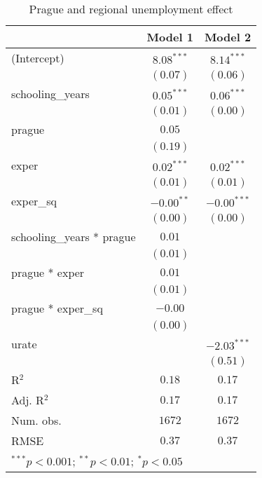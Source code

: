 
\begin{table}
\caption{Prague and regional unemployment effect}
\begin{center}
\begin{tabular}{l c c}
\hline
 & Model 1 & Model 2 \\
\hline
(Intercept)               & $8.08^{***}$ & $8.14^{***}$  \\
                          & $(0.07)$     & $(0.06)$      \\
schooling\_years          & $0.05^{***}$ & $0.06^{***}$  \\
                          & $(0.01)$     & $(0.00)$      \\
prague                    & $0.05$       &               \\
                          & $(0.19)$     &               \\
exper                     & $0.02^{***}$ & $0.02^{***}$  \\
                          & $(0.01)$     & $(0.01)$      \\
exper\_sq                 & $-0.00^{**}$ & $-0.00^{***}$ \\
                          & $(0.00)$     & $(0.00)$      \\
schooling\_years * prague & $0.01$       &               \\
                          & $(0.01)$     &               \\
prague * exper            & $0.01$       &               \\
                          & $(0.01)$     &               \\
prague * exper\_sq        & $-0.00$      &               \\
                          & $(0.00)$     &               \\
urate                     &              & $-2.03^{***}$ \\
                          &              & $(0.51)$      \\
\hline
R$^2$                     & $0.18$       & $0.17$        \\
Adj. R$^2$                & $0.17$       & $0.17$        \\
Num. obs.                 & $1672$       & $1672$        \\
RMSE                      & $0.37$       & $0.37$        \\
\hline
\multicolumn{3}{l}{\scriptsize{$^{***}p<0.001$; $^{**}p<0.01$; $^{*}p<0.05$}}
\end{tabular}
\label{table:coefficients}
\end{center}
\end{table}
